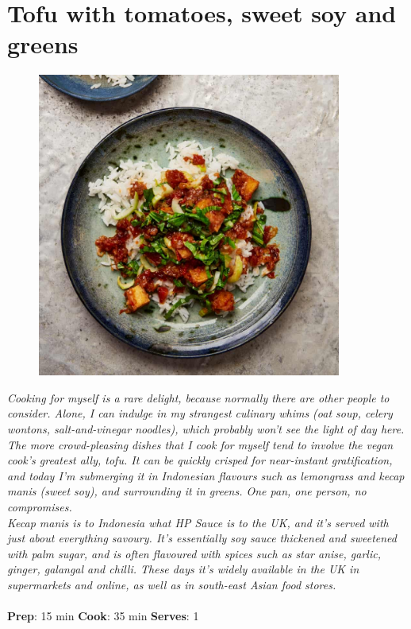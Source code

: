 \documentclass{book}
\begin{document}
\section{Tofu with tomatoes, sweet soy and greens}
\begin{figure}
\centering\includegraphics[width=10cm,height=10cm,keepaspectratio]{Recipe_Pictures/Tofu_with_tomatoes,_sweet_soy_and_greens.png}
\end{figure}
\emph{Cooking for myself is a rare delight, because normally there are other people to consider. Alone, I can indulge in my strangest culinary whims (oat soup, celery wontons, salt-and-vinegar noodles), which probably won’t see the light of day here. The more crowd-pleasing dishes that I cook for myself tend to involve the vegan cook’s greatest ally, tofu. It can be quickly crisped for near-instant gratification, and today I’m submerging it in Indonesian flavours such as lemongrass and kecap manis (sweet soy), and surrounding it in greens. One pan, one person, no compromises.\\ 
Kecap manis is to Indonesia what HP Sauce is to the UK, and it’s served with just about everything savoury. It’s essentially soy sauce thickened and sweetened with palm sugar, and is often flavoured with spices such as star anise, garlic, ginger, galangal and chilli. These days it’s widely available in the UK in supermarkets and online, as well as in south-east Asian food stores.}\\\\ 
\textbf{Prep}: 15 min
\textbf{Cook}: 35 min
\textbf{Serves}: 1
\end{document}
